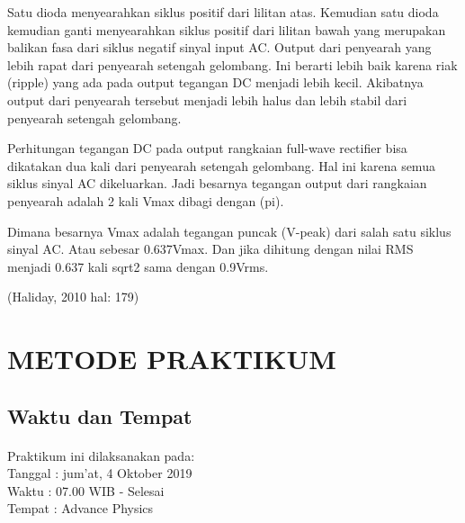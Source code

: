 \documentclass[12pt,a4paper]{article}
\begin{document}
	Satu dioda menyearahkan siklus positif dari lilitan atas. Kemudian satu dioda kemudian ganti menyearahkan siklus positif dari lilitan bawah yang merupakan balikan fasa dari siklus negatif sinyal input AC.
	Output dari penyearah yang lebih rapat dari penyearah setengah gelombang. Ini berarti lebih baik karena riak (ripple) yang ada pada output tegangan DC menjadi lebih kecil. Akibatnya output dari penyearah tersebut menjadi lebih halus dan lebih stabil dari penyearah setengah gelombang.

Perhitungan tegangan DC pada output rangkaian full-wave rectifier bisa dikatakan dua kali dari penyearah setengah gelombang. Hal ini karena semua siklus sinyal AC dikeluarkan. Jadi besarnya tegangan output dari rangkaian penyearah adalah 2 kali Vmax dibagi dengan (pi).

Dimana besarnya Vmax adalah tegangan puncak (V-peak) dari salah satu siklus sinyal AC. Atau sebesar 0.637Vmax. Dan jika dihitung dengan nilai RMS menjadi 0.637 kali sqrt2 sama dengan 0.9Vrms.

\begin{flushright}
	(Haliday, 2010 hal: 179)
\end{flushright}

\newpage
\section{METODE PRAKTIKUM}
\subsection{Waktu dan Tempat}
\paragraph{ }
Praktikum ini dilaksanakan pada:
\\ 		Tanggal : jum'at, 4 Oktober 2019
\\ 		Waktu : 07.00 WIB - Selesai
\\ 		Tempat : Advance Physics 
\end{document}
